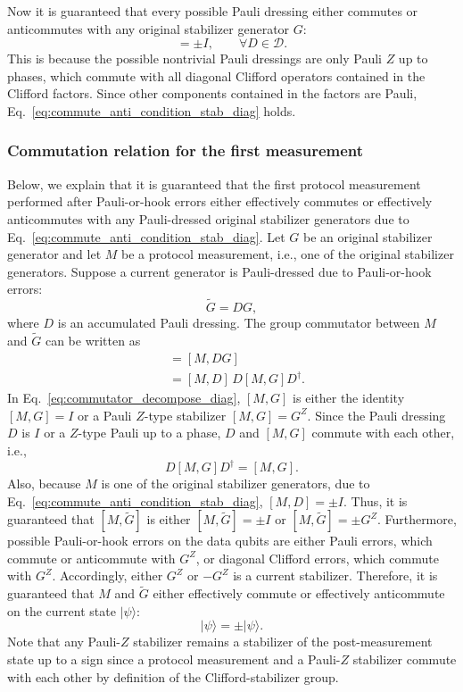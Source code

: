 \documentclass[
 reprint,
 amsmath,amssymb,
 pra,superscriptaddress, nofootinbib
]{revtex4-2}
\theoremstyle{definition}
\theoremstyle{plain}
\begin{document}
Now it is guaranteed that every possible Pauli dressing either commutes or anticommutes with any original stabilizer generator $G$:
\begin{equation}
  [G,D]=\pm I, \qquad  \forall D\in\mathcal{D}.
  \label{eq:commute_anti_condition_stab_diag}
\end{equation}  
This is because the possible nontrivial Pauli dressings are only Pauli $Z$ up to phases, which commute with all diagonal Clifford operators contained in the Clifford factors. Since other components contained in the factors are Pauli, Eq.~\eqref{eq:commute_anti_condition_stab_diag} holds.

\subsubsection{Commutation relation for the first measurement}

Below, we explain that it is guaranteed that the first protocol measurement performed after Pauli-or-hook errors either effectively commutes or effectively anticommutes with any Pauli-dressed original stabilizer generators due to Eq.~\eqref{eq:commute_anti_condition_stab_diag}. 
Let $G$ be an original stabilizer generator and let $M$ be a protocol measurement, i.e., one of the original stabilizer generators. Suppose a current generator is Pauli-dressed due to Pauli-or-hook errors:
\begin{equation}
  \tilde{G}=DG,
\end{equation}
where $D$ is an accumulated Pauli dressing.
The group commutator between $M$ and $\tilde{G}$ can be written as
\begin{align}
  [M,\tilde{G}]
  &=
  [M,DG]\\
  &=
  [M,D]\,D[M,G]D^\dagger.
  \label{eq:commutator_decompose_diag}
\end{align}
In Eq.~\eqref{eq:commutator_decompose_diag}, $[M,G]$ is either the identity $[M,G]=I$ or a Pauli $Z$-type stabilizer $[M,G]=G^Z$. 
Since the Pauli dressing $D$ is $I$ or a $Z$-type Pauli up to a phase, $D$ and $[M,G]$ commute with each other, i.e., 
\begin{equation}
  D[M,G]D^\dagger=[M,G].
\end{equation}
Also, because $M$ is one of the original stabilizer generators, due to Eq.~\eqref{eq:commute_anti_condition_stab_diag}, $[M,D]=\pm I$.
Thus, it is guaranteed that $[M,\tilde{G}]$ is either $[M,\tilde{G}]=\pm I$ or $[M,\tilde{G}]=\pm G^Z$. 
Furthermore, possible Pauli-or-hook errors on the data qubits are either Pauli errors, which commute or anticommute with $G^Z$, or diagonal Clifford errors, which commute with $G^Z$. Accordingly, either $G^Z$ or $-G^Z$ is a current stabilizer.
Therefore, it is guaranteed that $M$ and $\tilde{G}$ either effectively commute or effectively anticommute on the current state $|\psi\rangle$:
\begin{equation}
  [M,\tilde{G}]|\psi\rangle=\pm|\psi\rangle.
  \label{eq:M-dressed-G_diag}
\end{equation}
Note that any Pauli-$Z$ stabilizer remains a stabilizer of the post-measurement state up to a sign since a protocol measurement and a Pauli-$Z$ stabilizer commute with each other by definition of the Clifford-stabilizer group.
\end{document}
